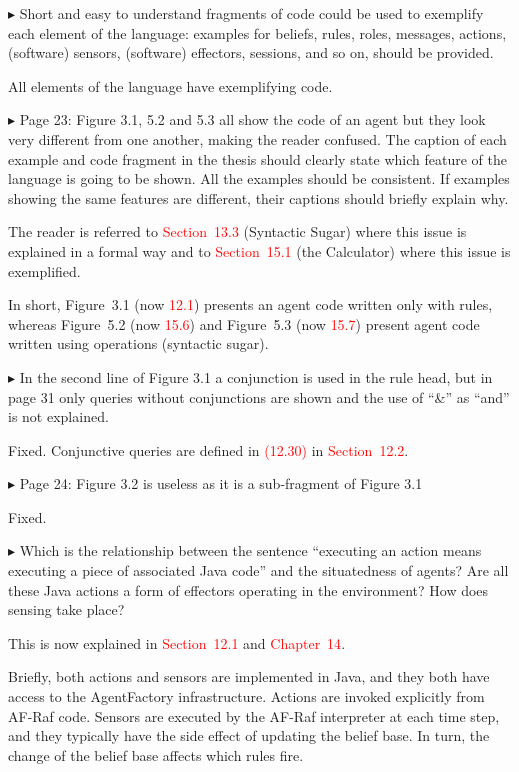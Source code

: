 \documentclass{article}
\newcommand*\R[1]{\textcolor{red}{#1}} %
\newenvironment{them}%
  {\bigskip\noindent\begingroup\color{blue}$\blacktriangleright$\enspace}%
  {\endgroup\par}
\begin{document}
\begin{them}
Short and easy to understand fragments of code could be used to exemplify each
element of the language: examples for beliefs, rules, roles, messages, actions,
(software) sensors, (software) effectors, sessions, and so on, should be
provided.
\end{them}
All elements of the language have exemplifying code. 

\begin{them}
Page 23:
Figure 3.1, 5.2 and 5.3 all show the code of an agent but they look very
different from one another, making the reader confused. The caption of each
example and code fragment in the thesis should clearly state which feature of
the language is going to be shown. All the examples should be consistent. If
examples showing the same features are different, their captions should briefly
explain why.
\end{them}
The reader is referred to \R{Section~13.3} (Syntactic Sugar) where this issue
is explained in a formal way and to \R{Section~15.1} (the Calculator) where
this issue is exemplified.

In short, Figure~3.1 (now \R{12.1}) presents an agent code written only with
rules, whereas Figure~5.2 (now \R{15.6}) and Figure~5.3 (now \R{15.7}) present
agent code written using operations (syntactic sugar).

\begin{them}
In the second line of Figure 3.1 a conjunction is used in the rule head, but in
page 31 only queries without conjunctions are shown and the use of ``\&'' as
``and'' is not explained.
\end{them}
Fixed.
Conjunctive queries are defined in \R{(12.30)} in \R{Section~12.2}.


\begin{them}
Page 24:
Figure 3.2 is useless as it is a sub-fragment of Figure 3.1
\end{them}
Fixed. 

\begin{them}
Which is the relationship between the sentence ``executing an action means
executing a piece of associated Java code'' and the situatedness of agents? Are
all these Java actions a form of effectors operating in the environment? How
does sensing take place?
\end{them}

This is now explained in \R{Section~12.1} and \R{Chapter~14}.

Briefly, both actions and sensors are implemented in Java,
  and they both have access to the AgentFactory infrastructure.
Actions are invoked explicitly from AF-Raf code.
Sensors are executed by the AF-Raf interpreter at each time step,
  and they typically have the side effect of updating the belief base.
In turn, the change of the belief base affects
  which rules fire.
\end{document}
